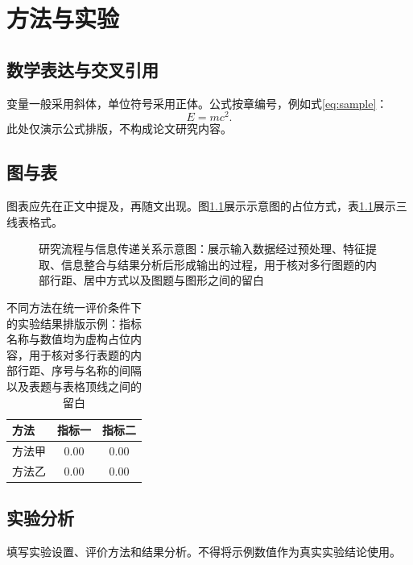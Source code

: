 \chapter{方法与实验}
\section{数学表达与交叉引用}
变量一般采用斜体，单位符号采用正体。公式按章编号，例如式\eqref{eq:sample}：
\begin{equation}
  E = mc^2 .\label{eq:sample}
\end{equation}
此处仅演示公式排版，不构成论文研究内容。

\section{图与表}
图表应先在正文中提及，再随文出现。图\ref{fig:sample}展示示意图的占位方式，表\ref{tab:sample}展示三线表格式。
\begin{figure}[htbp]
  \centering
  \caption{研究流程与信息传递关系示意图：展示输入数据经过预处理、特征提取、信息整合与结果分析后形成输出的过程，用于核对多行图题的内部行距、居中方式以及图题与图形之间的留白}\label{fig:sample}
\end{figure}
\begin{table}[htbp]
  \centering
  \caption{不同方法在统一评价条件下的实验结果排版示例：指标名称与数值均为虚构占位内容，用于核对多行表题的内部行距、序号与名称的间隔以及表题与表格顶线之间的留白}\label{tab:sample}
  \begin{tabular}{lcc}
    \toprule
    方法 & 指标一 & 指标二\\
    \midrule
    方法甲 & 0.00 & 0.00\\
    方法乙 & 0.00 & 0.00\\
    \bottomrule
  \end{tabular}
\end{table}

\section{实验分析}
填写实验设置、评价方法和结果分析。不得将示例数值作为真实实验结论使用。
